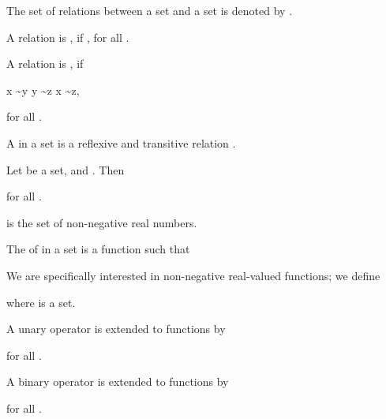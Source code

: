 \documentclass[b5paper, english, oneside]{memoir}
\begin{document}
\begin{definition}
The set of relations between a set  and a set  is denoted by . 
\end{definition}

\begin{definition}
A relation  is , if , for all .
\end{definition}

\begin{definition}
A relation  is , if
\begin{eqs}
x \sim y \land y \sim z \implies x \sim z,
\end{eqs}
for all .
\end{definition}

\begin{definition}[Preorder]
A  in a set  is a reflexive and transitive relation .
\end{definition}

\begin{definition}
Let  be a set, and . Then

for all . 
\end{definition}

\begin{example}
 is the set of non-negative real numbers.
\end{example}

\begin{definition}
The  of  in a set  is a function  such that 

\end{definition}

\begin{definition}
We are specifically interested in non-negative real-valued functions; we define 

where  is a set. 
\end{definition}

\begin{definition}
A unary operator  is extended to functions  by

for all .
\end{definition}

\begin{definition}
A binary operator  is extended to functions  by

for all .
\end{definition}
\end{document}
